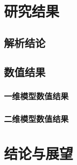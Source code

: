 	\section{研究结果}
	
		\subsection{解析结论}

			
		\subsection{数值结果}
		
			\subsubsection{一维模型数值结果}
			
			\subsubsection{二维模型数值结果}	

	\section{结论与展望}